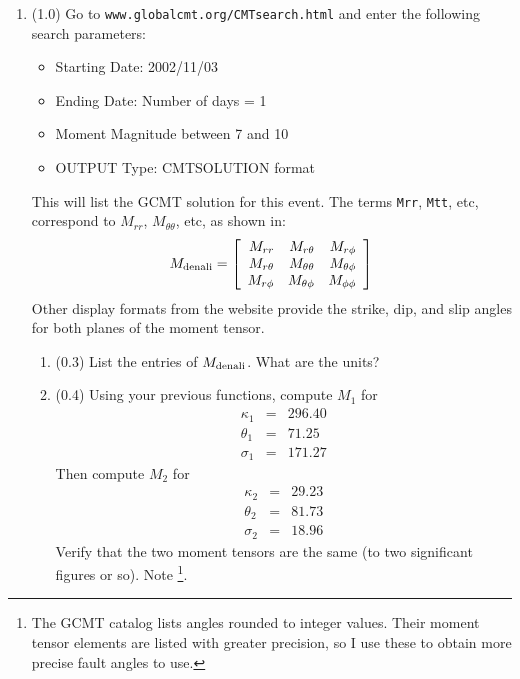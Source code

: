 \documentclass[11pt,titlepage,fleqn]{article}
\newcommand{\Mmat}{M}
\begin{document}
\begin{enumerate}

\item (1.0) Go to \verb+www.globalcmt.org/CMTsearch.html+ and enter the following search parameters:

\begin{itemize}
\item Starting Date: 2002/11/03
\item Ending Date: Number of days = 1
\item Moment Magnitude between 7 and 10
\item OUTPUT Type: CMTSOLUTION format
\end{itemize}
%
This will list the GCMT solution for this event. The terms \verb+Mrr+, \verb+Mtt+, etc, correspond to $M_{rr}$, $M_{\theta\theta}$, etc, as shown in:
%
\begin{equation}
\Mmat_{\rm denali} =
\left[ \begin{array}{rrr}
   M_{rr}     &  M_{r\theta}     & M_{r\phi}  \\
   M_{r\theta}  &  M_{\theta\theta} &  M_{\theta\phi}  \\
   M_{r\phi}   &  M_{\theta\phi}   &  M_{\phi\phi}
\end{array} \right]
\end{equation}
%
Other display formats from the website provide the strike, dip, and slip angles for both planes of the moment tensor.

\begin{enumerate}
\item (0.3) List the entries of $\Mmat_{\rm denali}$. What are the units?

\item (0.4) Using your previous functions, compute $\Mmat_1$ for 
%
\begin{eqnarray*}
\kappa_1 &=& 296.40
\\
\theta_1 &=& 71.25
\\
\sigma_1 &=& 171.27
\end{eqnarray*}
%
Then compute $\Mmat_2$ for
%
\begin{eqnarray*}
\kappa_2 &=& 29.23
\\
\theta_2 &=& 81.73
\\
\sigma_2 &=& 18.96
\end{eqnarray*}
%
 Verify that the two moment tensors are the same (to two significant figures or so). Note \footnote{The GCMT catalog lists angles rounded to integer values. Their moment tensor elements are listed with greater precision, so I use these to obtain more precise fault angles to use.}.


\end{enumerate}
\end{enumerate}
\end{document}
